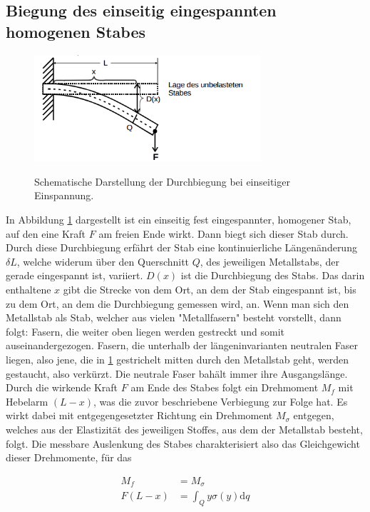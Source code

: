\documentclass[
  bibliography=totoc,     %
  captions=tableheading,  %
  titlepage=firstiscover, %
]{scrartcl}
\begin{document}
\subsection{Biegung des einseitig eingespannten homogenen Stabes}
\begin{figure}[H]
    \centering
    \caption{Schematische Darstellung der Durchbiegung bei einseitiger Einspannung. \cite{anleitung}}
    \includegraphics[width=0.75\textwidth]{V1031.png}
    \label{fig:1031}
\end{figure}
In Abbildung \ref{fig:1031} dargestellt ist ein einseitig fest eingespannter,
homogener Stab, auf den eine Kraft $F$ am freien Ende wirkt. Dann biegt sich
dieser Stab durch. Durch diese Durchbiegung erfährt der Stab eine
kontinuierliche Längenänderung $\delta{L}$, welche widerum über den Querschnitt
$Q$, des jeweiligen Metallstabs, der gerade eingespannt ist, variiert. $D(x)$
ist die Durchbiegung des Stabs. Das darin enthaltene $x$ gibt die Strecke von
dem Ort, an dem der Stab eingespannt ist, bis zu dem Ort, an dem die
Durchbiegung gemessen wird, an. Wenn man sich den Metallstab als Stab, welcher
aus vielen "Metallfasern" besteht vorstellt, dann folgt: Fasern, die weiter oben
liegen werden gestreckt und somit auseinandergezogen. Fasern, die unterhalb der
längeninvarianten neutralen Faser liegen, also jene, die in \ref{fig:1031}
gestrichelt mitten durch den Metallstab geht, werden gestaucht, also verkürzt.
Die neutrale Faser bahält immer ihre Ausgangslänge. Durch die wirkende
Kraft $F$ am Ende des Stabes folgt ein Drehmoment $M_f$ mit Hebelarm $(L-x)$,
was die zuvor beschriebene Verbiegung zur Folge hat. Es wirkt dabei mit
entgegengesetzter Richtung ein Drehmoment $M_\sigma$ entgegen, welches aus der
Elastizität des jeweiligen Stoffes, aus dem der Metallstab besteht, folgt. Die
messbare Auslenkung des Stabes charakterisiert also das Gleichgewicht dieser
Drehmomente, für das

\begin{align}
	M_f&=M_\sigma\\
	F(L-x)&=\int_Q y\sigma(y)\mathup{d}q
\end{align}
\end{document}
